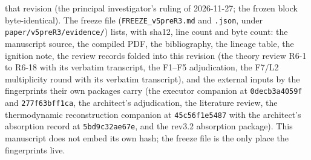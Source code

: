 \documentclass[11pt,a4paper]{article}
\begin{document}
that revision (the principal investigator's ruling of 2026-11-27; the frozen block byte-identical). The freeze file (\texttt{FREEZE\_v5preR3.md} and \texttt{.json}, under \texttt{paper/v5preR3/evidence/}) lists, with sha12, line count and byte count: the manuscript source, the compiled PDF, the bibliography, the lineage table, the ignition note, the review records folded into this revision (the theory review R6-1 to R6-18 with its verbatim transcript, the F1--F5 adjudication, the F7/L2 multiplicity round with its verbatim transcript), and the external inputs by the fingerprints their own packages carry (the executor companion at \texttt{0decb3a4059f} and \texttt{277f63bff1ca}, the architect's adjudication, the literature review, the thermodynamic reconstruction companion at \texttt{45c56f1e5487} with the architect's absorption record at \texttt{5bd9c32ae67e}, and the rev3.2 absorption package). This manuscript does not embed its own hash; the freeze file is the only place the fingerprints live.
\end{document}
